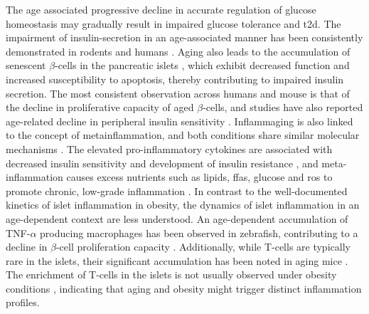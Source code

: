 \par The age associated progressive decline in accurate regulation of glucose homeostasis may gradually result in impaired glucose tolerance and \gls{t2d}. The impairment of insulin-secretion in an age-associated manner has been consistently demonstrated in rodents and humans \textbf{\cite{sandovici_ageing_2016,muzumdar_decrease_2004}}. Aging also leads to the accumulation of senescent $\beta$-cells in the pancreatic islets \textbf{\cite{tuduri_pancreatic_2022}}, which exhibit decreased function and increased susceptibility to apoptosis, thereby contributing to impaired insulin secretion. The most consistent observation across humans and mouse is that of the decline in proliferative capacity of aged $\beta$-cells, and studies have also reported age-related decline in peripheral insulin sensitivity \textbf{\cite{tuduri_pancreatic_2022}}. Inflammaging is also linked to the concept of metainflammation, and both conditions share similar molecular mechanisms \textbf{\cite{franceschi_inflammaging_2018,prattichizzo_inflammageing_2018}}. The elevated pro-inflammatory cytokines are associated with decreased insulin sensitivity and development of insulin resistance \textbf{\cite{rehman_mechanisms_2016}}, and meta-inflammation causes excess nutrients such as lipids, \glspl{ffa}, glucose and \gls{ros} to promote chronic, low-grade inflammation \textbf{\cite{frasca_aging_2017}}. In contrast to the well-documented kinetics of islet inflammation in obesity, the dynamics of islet inflammation in an age-dependent context are less understood. An age-dependent accumulation of TNF-$\alpha$ producing macrophages has been observed in zebrafish, contributing to a decline in $\beta$-cell proliferation capacity \textbf{\cite{janjuha_age-related_2018}}. Additionally, while T-cells are typically rare in the islets, their significant accumulation has been noted in aging mice \textbf{\cite{denroche_t_2021}}. The enrichment of T-cells in the islets is not usually observed under obesity conditions \textbf{\cite{eguchi_islet_2017}}, indicating that aging and obesity might trigger distinct inflammation profiles.\\

